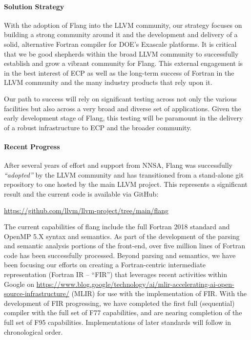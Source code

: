 \paragraph{Solution Strategy}

With the adoption of Flang into the LLVM community, our strategy
focuses on building a strong community around it and the development
and delivery of a solid, alternative Fortran compiler for DOE's
Exascale platforms.  It is critical that we be good shepherds within
the broad LLVM community to successfully establish and grow a vibrant
community for Flang. This external engagement is in the best interest
of ECP as well as the long-term success of Fortran in the LLVM
community and the many industry products that rely upon it.

Our path to success will rely on significant testing across not only
the various facilities but also across a very broad and diverse set of
applications. Given the early development stage of Flang, this testing
will be paramount in the delivery of a robust infrastructure to ECP
and the broader community.

\paragraph{Recent Progress}

After several years of effort and support from NNSA, Flang was 
successfully \emph{``adopted''} by the LLVM community and has transitioned 
from a stand-alone git repository to one hosted by the main LLVM project.  This 
represents a significant result and the current code is available via GitHub:

\begin{center}
\url{https://github.com/llvm/llvm-project/tree/main/flang}
\end{center}

The current capabilities of flang include the full Fortran 2018
standard and OpenMP 5.X syntax and semantics.  As part of the
development of the parsing and semantic analysis portions of the
front-end, over five million lines of Fortran code has been
successfully processed. Beyond parsing and semantics, we have been
focusing our efforts on creating a Fortran-centric intermediate
representation (Fortran IR -- ``FIR'') that leverages recent activities
within Google on 
\href{Multi-Level Intermediate Representations} 
{https://www.blog.google/technology/ai/mlir-accelerating-ai-open-source-infrastructure/}
(MLIR) for use with the implementation of FIR.
With the development of FIR progressing, we have completed
the first full (sequential) compiler with the full set of F77 
capabilities, and are nearing completion of the full set of F95 capabilities.
Implementations of later standards will follow in chronological order.

